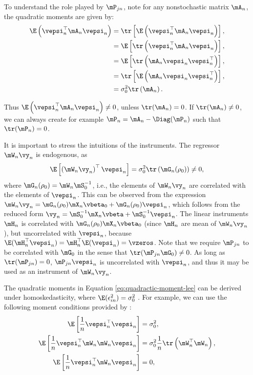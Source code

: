 To understand the role played by $\mP_{jn}$, note for any nonstochastic matrix $\mA_{n}$, the quadratic moments are given by:
\begin{equation*}
\begin{aligned}
 \E\left(\vepsi_n^\top \mA_n\vepsi_n\right)& = \tr\left[\E\left(\vepsi_n^\top \mA_n\vepsi_n\right)\right], \\
 & = \E\left[\tr\left(\vepsi_n^\top \mA_n\vepsi_n\right)\right], \\
 & = \E\left[\tr\left(\mA_n\vepsi_n\vepsi_n^\top\right)\right], \\
  & = \tr\left[\E\left(\mA_n\vepsi_n\vepsi_n^\top\right)\right], \\
 & = \sigma_0^2\tr\left(\mA_n\right). 
\end{aligned}
\end{equation*}

Thus $\E\left(\vepsi_n^\top \mA_n\vepsi_n\right)\neq 0$, unless $\tr(\mA_n) = 0$. If $\tr(\mA_n) \neq 0$, we can always create for example $\mP_n = \mA_n - \Diag(\mP_n)$ such that $\tr(\mP_n) = 0$. 

It is important to stress the intuitions of the instruments. The regressor $\mW_n\vy_n$ is endogenous, as
\begin{equation*}
\E\left[\left(\mW_n\vy_n\right)^\top \vepsi_n\right] = \sigma_0^2\tr\left(\mG_n(\rho_0)\right) \neq 0, 
\end{equation*}
%
where $\mG_n(\rho_0) = \mW_n\mS_0^{-1}$, i.e., the elements of $\mW_n\vy_n$ are correlated with the elements of $\vepsi_n$. This can be observed from the expression $\mW_n\vy_n = \mG_n(\rho_0)\mX_n\vbeta_0 + \mG_n(\rho_0)\vepsi_n$, which follows from the reduced form $\vy_n = \mS_0^{-1}\mX_n\vbeta + \mS_0^{-1}\vepsi_n$. The linear instruments $\mH_n$ is correlated with $\mG_n(\rho_0)\mX_n\vbeta_0$ (since $\mH_n$ are mean of $\mW_n\vy_n$),  but uncorrelated with $\vepsi_n$, because $\E(\mH_n^\top\vepsi_n) = \mH_n^\top\E(\vepsi_n) = \vzeros$. Note that we require $\mP_{jn}$ to be correlated with $\mG_0$ in the sense that $\tr(\mP_{jn}\mG_0)\neq 0$. As long as $\tr(\mP_{jn}) = 0$, $\mP_{jn}\vepsi_n$ is uncorrelated with $\vepsi_n$, and thus it may be used as an instrument of $\mW_n\vy_n$. 

The quadratic moments in Equation \eqref{eq:quadractic-moment-lee} can be derived under homoskedasticity, where $\E(\epsilon_{in}^2) = \sigma_0^2$ \citep{lee2001generalized}. For example, we can use the following moment conditions provided by \cite{kelejian1999generalized}:
\begin{equation}\label{eq:moments-kp-1999}
  \begin{aligned}
  \E\left[\frac{1}{n}\vepsi_n^\top \vepsi_n\right]           & = \sigma^2_0, \\
   \E\left[\frac{1}{n}\vepsi_n^\top\mW_n\mW_n\vepsi_n\right] & = \sigma^2_0\frac{1}{n}\tr\left(\mW_n^\top\mW_n\right), \\
   \E\left[\frac{1}{n}\vepsi_n^\top \mW_n \vepsi_n\right]    & =  0,
   \end{aligned}
\end{equation}

